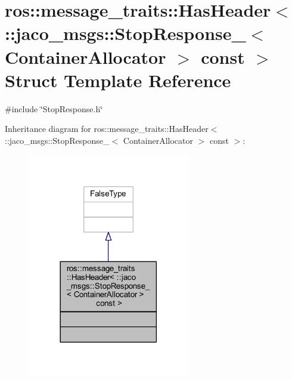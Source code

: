 \hypertarget{structros_1_1message__traits_1_1HasHeader_3_01_1_1jaco__msgs_1_1StopResponse___3_01ContainerAllocator_01_4_01const_01_01_4}{}\section{ros\+:\+:message\+\_\+traits\+:\+:Has\+Header$<$ \+:\+:jaco\+\_\+msgs\+:\+:Stop\+Response\+\_\+$<$ Container\+Allocator $>$ const $>$ Struct Template Reference}
\label{structros_1_1message__traits_1_1HasHeader_3_01_1_1jaco__msgs_1_1StopResponse___3_01ContainerAllocator_01_4_01const_01_01_4}


{\ttfamily \#include \char`\"{}Stop\+Response.\+h\char`\"{}}



Inheritance diagram for ros\+:\+:message\+\_\+traits\+:\+:Has\+Header$<$ \+:\+:jaco\+\_\+msgs\+:\+:Stop\+Response\+\_\+$<$ Container\+Allocator $>$ const $>$\+:
\nopagebreak
\begin{figure}[H]
\begin{center}
\leavevmode
\includegraphics[width=201pt]{d0/d2b/structros_1_1message__traits_1_1HasHeader_3_01_1_1jaco__msgs_1_1StopResponse___3_01ContainerAlloe96ffebd9a43cb01947c708c51440fc5}
\end{center}
\end{figure}


